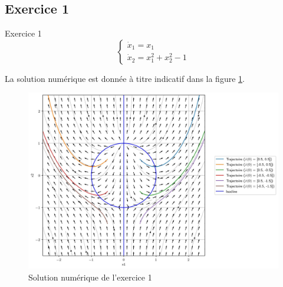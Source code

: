         \subsection{Exercice 1}
            \begin{exercise}{Exercice 1}
                \begin{equation}
                    \begin{cases}
                        \dot{x}_1 = x_1 \\
                        \dot{x}_2 = x_1^2 + x_2^2 - 1
                    \end{cases}
                \end{equation}
            \end{exercise}
            La solution numérique est donnée à titre indicatif dans la figure \ref{fig:pdp_exercice_3_1}.
            \begin{figure}[ht!]
                \centering
                \includegraphics[width=\textwidth]{images/pdp_exercice_3_1.jpg}
                \caption{Solution numérique de l'exercice 1}
                \label{fig:pdp_exercice_3_1}
            \end{figure}
            
